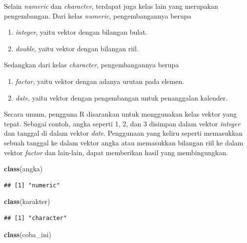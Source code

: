 \documentclass[]{book}
\newenvironment{Shaded}{\begin{snugshade}}{\end{snugshade}}
\newcommand{\KeywordTok}[1]{\textcolor[rgb]{0.13,0.29,0.53}{\textbf{#1}}}
\newcommand{\NormalTok}[1]{#1}
\providecommand{\tightlist}{%
  \setlength{\itemsep}{0pt}\setlength{\parskip}{0pt}}
\begin{document}
Selain \emph{numeric} dan \emph{character}, terdapat juga kelas lain
yang merupakan pengembangan. Dari kelas \emph{numeric}, pengembangannya
berupa

\begin{enumerate}
\def\labelenumi{\arabic{enumi}.}
\tightlist
\item
  \emph{integer}, yaitu vektor dengan bilangan bulat.
\item
  \emph{double}, yaitu vektor dengan bilangan riil.
\end{enumerate}

Sedangkan dari kelas \emph{character}, pengembangannya berupa

\begin{enumerate}
\def\labelenumi{\arabic{enumi}.}
\tightlist
\item
  \emph{factor}, yaitu vektor dengan adanya urutan pada elemen.
\item
  \emph{date}, yaitu vektor dengan pengembangan untuk penanggalan
  kalender.
\end{enumerate}

Secara umum, pengguna R disarankan untuk menggunakan kelas vektor yang
tepat. Sebagai contoh, angka seperti 1, 2, dan 3 disimpan dalam vektor
\emph{integer} dan tanggal di dalam vektor \emph{date}. Penggunaan yang
keliru seperti memasukkan sebuah tanggal ke dalam vektor angka atau
memasukkan bilangan riil ke dalam vektor \emph{factor} dan lain-lain,
dapat memberikan hasil yang membingungkan.

\begin{Shaded}
\begin{Highlighting}[]
\KeywordTok{class}\NormalTok{(angka)}
\end{Highlighting}
\end{Shaded}

\begin{verbatim}
## [1] "numeric"
\end{verbatim}

\begin{Shaded}
\begin{Highlighting}[]
\KeywordTok{class}\NormalTok{(karakter)}
\end{Highlighting}
\end{Shaded}

\begin{verbatim}
## [1] "character"
\end{verbatim}

\begin{Shaded}
\begin{Highlighting}[]
\KeywordTok{class}\NormalTok{(coba_ini)}
\end{Highlighting}
\end{Shaded}
\end{document}
